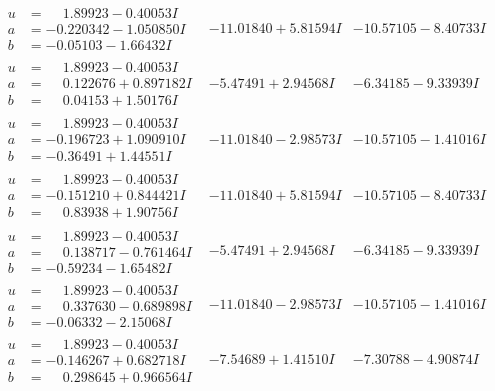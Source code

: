 \documentclass[1p]{elsarticle_modified}
\theoremstyle{definition}
\begin{document}
$$\begin{array}{c|c|c}
\begin{aligned}
u &= \phantom{-}1.89923 - 0.40053 I \\
a &= -0.220342 - 1.050850 I \\
b &= -0.05103 - 1.66432 I\end{aligned}
 & -11.01840 + 5.81594 I & -10.57105 - 8.40733 I \\ \hline\begin{aligned}
u &= \phantom{-}1.89923 - 0.40053 I \\
a &= \phantom{-}0.122676 + 0.897182 I \\
b &= \phantom{-}0.04153 + 1.50176 I\end{aligned}
 & -5.47491 + 2.94568 I & -6.34185 - 9.33939 I \\ \hline\begin{aligned}
u &= \phantom{-}1.89923 - 0.40053 I \\
a &= -0.196723 + 1.090910 I \\
b &= -0.36491 + 1.44551 I\end{aligned}
 & -11.01840 - 2.98573 I & -10.57105 - 1.41016 I \\ \hline\begin{aligned}
u &= \phantom{-}1.89923 - 0.40053 I \\
a &= -0.151210 + 0.844421 I \\
b &= \phantom{-}0.83938 + 1.90756 I\end{aligned}
 & -11.01840 + 5.81594 I & -10.57105 - 8.40733 I \\ \hline\begin{aligned}
u &= \phantom{-}1.89923 - 0.40053 I \\
a &= \phantom{-}0.138717 - 0.761464 I \\
b &= -0.59234 - 1.65482 I\end{aligned}
 & -5.47491 + 2.94568 I & -6.34185 - 9.33939 I \\ \hline\begin{aligned}
u &= \phantom{-}1.89923 - 0.40053 I \\
a &= \phantom{-}0.337630 - 0.689898 I \\
b &= -0.06332 - 2.15068 I\end{aligned}
 & -11.01840 - 2.98573 I & -10.57105 - 1.41016 I \\ \hline\begin{aligned}
u &= \phantom{-}1.89923 - 0.40053 I \\
a &= -0.146267 + 0.682718 I \\
b &= \phantom{-}0.298645 + 0.966564 I\end{aligned}
 & -7.54689 + 1.41510 I & -7.30788 - 4.90874 I \\ \hline\begin{aligned}

\end{aligned}
\end{array}$$
\end{document}
